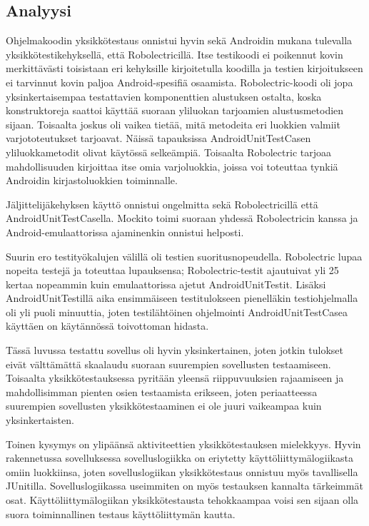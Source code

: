 \subsection{Analyysi}

Ohjelmakoodin yksikkötestaus onnistui hyvin sekä Androidin mukana tulevalla yksikkötestikehyksellä, että Robolectricillä. Itse testikoodi ei poikennut kovin merkittävästi toisistaan eri kehyksille kirjoitetulla koodilla ja testien kirjoitukseen ei tarvinnut kovin paljoa Android-spesifiä osaamista. Robolectric-koodi oli jopa yksinkertaisempaa testattavien komponenttien alustuksen ostalta, koska konstruktoreja saattoi käyttää suoraan yliluokan tarjoamien alustusmetodien sijaan. Toisaalta joskus oli vaikea tietää, mitä metodeita eri luokkien valmiit varjototeutukset tarjoavat. Näissä tapauksissa AndroidUnitTestCasen yliluokkametodit olivat käytössä selkeämpiä. Toisaalta Robolectric tarjoaa mahdollisuuden kirjoittaa itse omia varjoluokkia, joissa voi toteuttaa tynkiä Androidin kirjastoluokkien toiminnalle.

Jäljittelijäkehyksen käyttö onnistui ongelmitta sekä Robolectricillä että AndroidUnitTestCasella. Mockito toimi suoraan yhdessä Robolectricin kanssa ja Android-emulaattorissa ajaminenkin onnistui helposti.

Suurin ero testityökalujen välillä oli testien suoritusnopeudella. Robolectric lupaa nopeita testejä ja toteuttaa lupauksensa; Robolectric-testit ajautuivat yli 25 kertaa nopeammin kuin emulaattorissa ajetut AndroidUnitTestit. Lisäksi AndroidUnitTestillä aika ensimmäiseen testitulokseen pienelläkin testiohjelmalla oli yli puoli minuuttia, joten testilähtöinen ohjelmointi AndroidUnitTestCasea käyttäen on käytännössä toivottoman hidasta.

Tässä luvussa testattu sovellus oli hyvin yksinkertainen, joten jotkin tulokset eivät välttämättä skaalaudu suoraan suurempien sovellusten testaamiseen. Toisaalta yksikkötestauksessa pyritään yleensä riippuvuuksien rajaamiseen ja mahdollisimman pienten osien testaamista erikseen, joten periaatteessa suurempien sovellusten yksikkötestaaminen ei ole juuri vaikeampaa kuin yksinkertaisten. 

Toinen kysymys on ylipäänsä aktiviteettien yksikkötestauksen mielekkyys. Hyvin rakennetussa sovelluksessa sovelluslogiikka on eriytetty käyttöliittymälogiikasta omiin luokkiinsa, joten sovelluslogiikan yksikkötestaus onnistuu myös tavallisella JUnitilla. Sovelluslogiikassa useimmiten on myös testauksen kannalta tärkeimmät osat. Käyttöliittymälogiikan yksikkötestausta tehokkaampaa voisi sen sijaan olla suora toiminnallinen testaus käyttöliittymän kautta.